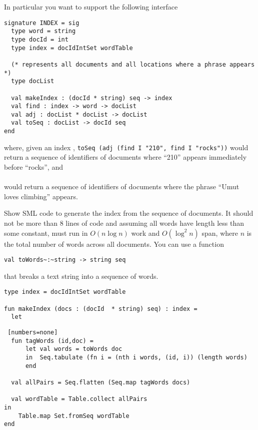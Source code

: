 In particular you want to support the following interface
\begin{lstlisting}[numbers=none]
signature INDEX = sig
  type word = string
  type docId = int
  type index = docIdIntSet wordTable
  
  (* represents all documents and all locations where a phrase appears *)
  type docList

  val makeIndex : (docId * string) seq -> index    
  val find : index -> word -> docList
  val adj : docList * docList -> docList
  val toSeq : docList -> docId seq 
end
\end{lstlisting}
%
where, given an index ,
\texttt{toSeq (adj (find I "210", find I "rocks"))} would return a sequence of
identifiers of documents
where ``210'' appears immediately before ``rocks'', and 
\\
\\
would return a sequence of identifiers of documents
where the phrase ``Umut loves climbing'' appears.


\begin{problem}[8p]
\ask
Show SML code to generate the index from the sequence of documents.
It should not be more than 8 lines of code and assuming all words have
length less than some constant, must run in $O(n \log n)$ work and
$O(\log^2 n)$ span, where $n$ is the total number of words across all
documents.    You can use a function
\begin{lstlisting}
val toWords~:~string -> string seq
\end{lstlisting}
that breaks a text string into a sequence of words.

\begin{lstlisting}[numbers=none]
type index = docIdIntSet wordTable

fun makeIndex (docs : (docId  * string) seq) : index =
  let
\end{lstlisting}

\sol

\begin{lstlisting} [numbers=none]
  fun tagWords (id,doc) = 
      let val words = toWords doc
      in  Seq.tabulate (fn i = (nth i words, (id, i)) (length words) 
      end

  val allPairs = Seq.flatten (Seq.map tagWords docs)

  val wordTable = Table.collect allPairs
in
    Table.map Set.fromSeq wordTable
end
\end{lstlisting}
\end{problem}

